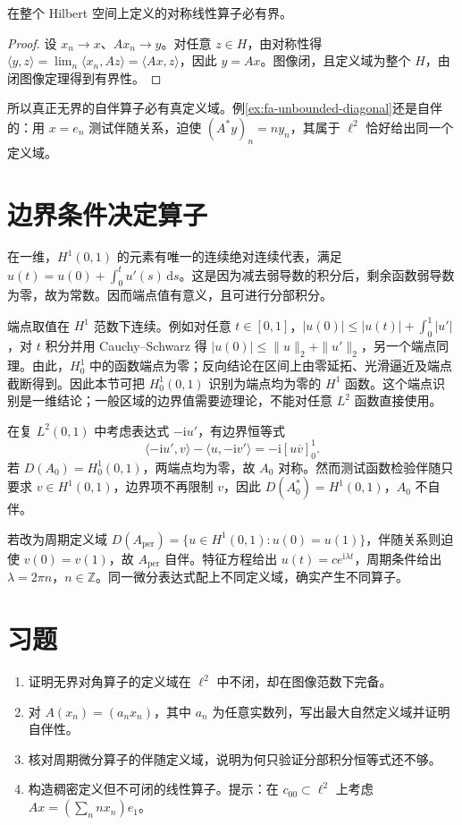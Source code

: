 \begin{theorem}
在整个 Hilbert 空间上定义的对称线性算子必有界。
\end{theorem}
\begin{proof}
设 $x_n\to x$、$Ax_n\to y$。对任意 $z\in H$，由对称性得 $\langle y,z\rangle=\lim_n\langle x_n,Az\rangle=\langle Ax,z\rangle$，因此 $y=Ax$。图像闭，且定义域为整个 $H$，由闭图像定理得到有界性。
\end{proof}
所以真正无界的自伴算子必有真定义域。例\ref{ex:fa-unbounded-diagonal}还是自伴的：用 $x=e_n$ 测试伴随关系，迫使 $(A^*y)_n=ny_n$，其属于 $\ell^2$ 恰好给出同一个定义域。

\section{边界条件决定算子}
在一维，$H^1(0,1)$ 的元素有唯一的连续绝对连续代表，满足 $u(t)=u(0)+\int_0^tu'(s)\,\mathrm ds$。这是因为减去弱导数的积分后，剩余函数弱导数为零，故为常数。因而端点值有意义，且可进行分部积分。

端点取值在 $H^1$ 范数下连续。例如对任意 $t\in[0,1]$，$|u(0)|\leq|u(t)|+\int_0^1|u'|$，对 $t$ 积分并用 Cauchy--Schwarz 得 $|u(0)|\leq\|u\|_2+\|u'\|_2$，另一个端点同理。由此，$H_0^1$ 中的函数端点为零；反向结论在区间上由零延拓、光滑逼近及端点截断得到。因此本节可把 $H_0^1(0,1)$ 识别为端点均为零的 $H^1$ 函数。这个端点识别是一维结论；一般区域的边界值需要迹理论，不能对任意 $L^2$ 函数直接使用。

在复 $L^2(0,1)$ 中考虑表达式 $-\mathrm i u'$，有边界恒等式
\[
 \langle-\mathrm iu',v\rangle-\langle u,-\mathrm iv'\rangle
 =-\mathrm i[u\overline v]_0^1.
\]
若 $D(A_0)=H_0^1(0,1)$，两端点均为零，故 $A_0$ 对称。然而测试函数检验伴随只要求 $v\in H^1(0,1)$，边界项不再限制 $v$，因此 $D(A_0^*)=H^1(0,1)$，$A_0$ 不自伴。

若改为周期定义域 $D(A_{\mathrm{per}})=\{u\in H^1(0,1):u(0)=u(1)\}$，伴随关系则迫使 $v(0)=v(1)$，故 $A_{\mathrm{per}}$ 自伴。特征方程给出 $u(t)=ce^{\mathrm i\lambda t}$，周期条件给出 $\lambda=2\pi n$，$n\in\mathbb Z$。同一微分表达式配上不同定义域，确实产生不同算子。

\section{习题}
\begin{enumerate}
 \item 证明无界对角算子的定义域在 $\ell^2$ 中不闭，却在图像范数下完备。
 \item 对 $A(x_n)=(a_nx_n)$，其中 $a_n$ 为任意实数列，写出最大自然定义域并证明自伴性。
 \item 核对周期微分算子的伴随定义域，说明为何只验证分部积分恒等式还不够。
 \item 构造稠密定义但不可闭的线性算子。提示：在 $c_{00}\subset\ell^2$ 上考虑 $Ax=(\sum_nnx_n)e_1$。
\end{enumerate}

